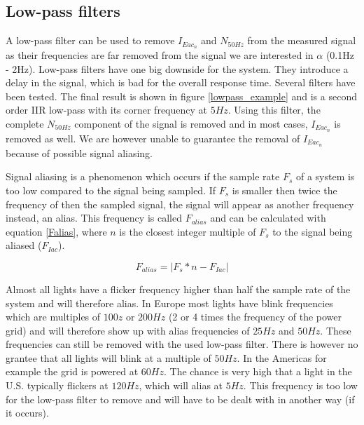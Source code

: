 \subsection{Low-pass filters}
A low-pass filter can be used to remove $I_{Eac{_n}}$ and $N_{50Hz}$ from the measured signal as their frequencies are far removed from the signal we are interested in $\alpha$ (0.1Hz - 2Hz). Low-pass filters have one big downside for the system. They introduce a delay in the signal, which is bad for the overall response time. Several filters have been tested. The final result is shown in figure \ref{lowpass_example} and is a second order IIR low-pass with its corner frequency at $5Hz$. Using this filter, the complete $N_{50Hz}$ component of the signal is removed and in most cases, $I_{Eac{_n}}$ is removed as well. We are however unable to guarantee the removal of $I_{Eac{_n}}$ because of possible signal aliasing.

Signal aliasing is a phenomenon which occurs if the sample rate $F_{s}$ of a system is too low compared to the signal being sampled. If $F_{s}$ is smaller then twice the frequency of then the sampled signal, the signal will appear as another frequency instead, an alias. This frequency is called $F_{alias}$ and can be calculated with equation \ref{Falias}, where $n$ is the closest integer multiple of $F_{s}$ to the signal being aliased ($F_{Iac}$).

\begin{equation}
\label{Falias}
	F_{alias} = |F_{s} * n - F_{Iac}|
\end{equation}

Almost all lights have a flicker frequency higher than half the sample rate of the system and will therefore alias. In Europe most lights have blink frequencies which are multiples of $100z$ or $200Hz$ (2 or 4 times the frequency of the power grid) and will therefore show up with alias frequencies of $25Hz$ and $50Hz$. These frequencies can still be removed with the used low-pass filter. There is however no grantee that all lights will blink at a multiple of $50Hz$. In the Americas for example the grid is powered at $60Hz$. The chance is very high that a light in the U.S. typically flickers at $120Hz$, which will alias at $5Hz$. This frequency is too low for the low-pass filter to remove and will have to be dealt with in another way (if it occurs).


